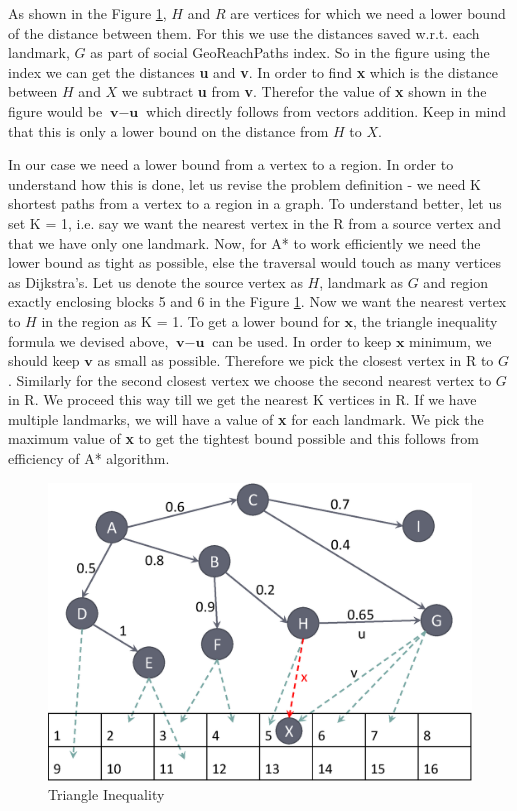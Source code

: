 {As shown in the Figure \ref{fig:tri-ine}, $H$ and $R$ are vertices for which we need a lower bound of the distance between them. For this we use the distances saved w.r.t. each landmark, $G$ as part of social GeoReachPaths index. So in the figure using the index we can get the distances \textbf{u} and \textbf{v}. In order to find \textbf{x} which is the distance between $H$ and $X$ we subtract \textbf{u} from \textbf{v}. Therefor the value of \textbf{x} shown in the figure would be $\textbf{v} - \textbf{u}$ which directly follows from vectors addition. Keep in mind that this is only a lower bound on the distance from $H$ to $X$.

In our case we need a lower bound from a vertex to a region. In order to understand how this is done, let us revise the problem definition - we need K shortest paths from a vertex to a region in a graph. To understand better, let us set K = 1, i.e. say we want the nearest vertex in the R from a source vertex and that we have only one landmark. Now, for A* to work efficiently we need the lower bound as tight as possible, else the traversal would touch as many vertices as Dijkstra's. Let us denote the source vertex as $H$, landmark as $G$ and region exactly enclosing blocks 5 and 6 in the Figure \ref{fig:tri-ine}. Now we want the nearest vertex to $H$ in the region as K = 1. To get a lower bound for $\textbf{x}$, the triangle inequality formula we devised above, $\textbf{v} - \textbf{u}$ can be used. In order to keep $\textbf{x}$ minimum, we should keep $\textbf{v}$ as small as possible. Therefore we pick the closest vertex in R to $G$. Similarly for the second closest vertex we choose the second nearest vertex to $G$ in R. We proceed this way till we get the nearest K vertices in R. If we have multiple landmarks, we will have a value of \textbf{x} for each landmark. We pick the maximum value of \textbf{x} to get the tightest bound possible and this follows from efficiency of A* algorithm.

\begin{figure}[t]
    \centering
    \includegraphics[width=0.88\linewidth]{images/triangle_inequality.eps}
    \caption{Triangle Inequality}
    \label{fig:tri-ine}
\end{figure}

}
